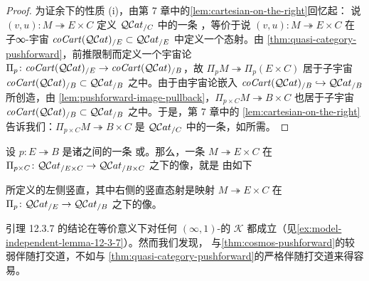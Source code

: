 \begin{proof}
为证余下的性质 (i)，由第 7 章中的\cref{lem:cartesian-on-the-right}回忆起：
说 $(v,u)\colon M\twoheadrightarrow E\times C$ 定义 $\mathcal{Q}\mathcal{C}at_{/C}$ 中的一条%
\trCocartesianFibration，等价于说 $(v,u)\colon M\twoheadrightarrow E\times C$
在子∞-宇宙 $\mathit{coCart}(\mathcal{Q}\mathcal{C}at)_{/E}\subset\mathcal{Q}\mathcal{C}at_{/E}$ 中定义一个态射。由%
\cref{thm:quasi-category-pushforward}，前推限制而定义一个宇宙论\trFunctor{}
$\Pi_{p}\colon\mathit{coCart}(\mathcal{Q}\mathcal{C}at)_{/E}\to\mathit{coCart}(\mathcal{Q}\mathcal{C}at)_{/B}$，故
$\Pi_{p}M\twoheadrightarrow\Pi_{p}(E\times C)$ 居于子宇宙
$\mathit{coCart}(\mathcal{Q}\mathcal{C}at)_{/B}\subset\mathcal{Q}\mathcal{C}at_{/B}$ 之中。由于\trPullback{}由宇宙论嵌入
$\mathit{coCart}(\mathcal{Q}\mathcal{C}at)_{/B}\hookrightarrow\mathcal{Q}\mathcal{C}at_{/B}$ 所创造，由%
\cref{lem:pushforward-image-pullback}，$\Pi_{p\times C}M\twoheadrightarrow B\times C$
也居于子宇宙 $\mathit{coCart}(\mathcal{Q}\mathcal{C}at)_{/B}\subset\mathcal{Q}\mathcal{C}at_{/B}$ 之中。于是，第 7 章中的%
\cref{lem:cartesian-on-the-right}告诉我们：$\Pi_{p\times C}M\twoheadrightarrow B\times C$
是 $\mathcal{Q}\mathcal{C}at_{/C}$ 中的一条\trCocartesianFibration，如所需。
\end{proof}

\begin{lemma}\label{lem:pushforward-image-pullback}
设 $p\colon E\twoheadrightarrow B$ 是诸\trQuasiCategory{}之间的一条%
\trCartesianFibration{}或\trCocartesianFibration。那么，一条\trIsofibration{}
$M\twoheadrightarrow E\times C$ 在
$\Pi_{p\times C}\colon\mathcal{Q}\mathcal{C}at_{/E\times C}\to\mathcal{Q}\mathcal{C}at_{/B\times C}$ 之下的像，就是
由如下\trPullback
\begin{center}
\end{center}
所定义的左侧竖直\trIsofibration，其中右侧的竖直态射是映射
$M\twoheadrightarrow E\times C$ 在
$\Pi_{p}\colon\mathcal{Q}\mathcal{C}at_{/E}\to\mathcal{Q}\mathcal{C}at_{/B}$ 之下的像。
\end{lemma}

引理 12.3.7 的结论在等价意义下对任何 $(\infty,1)$-\trCategory{}的%
\trInfinityCosmos{} $\mathcal{K}$ 都成立（见\cref{ex:model-independent-lemma-12-3-7}）。然而我们发现，
与\cref{thm:cosmos-pushforward}的较弱伴随打交道，不如与%
\cref{thm:quasi-category-pushforward}的严格伴随打交道来得容易。


